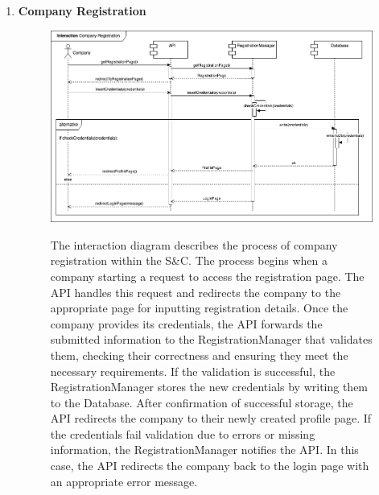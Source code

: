 \begin{enumerate}
    \newpage
    \item \textbf{Company Registration}
    \begin{figure}[h!]
            \centering  \includegraphics[width=1\textwidth]{DD/Images/Interactions/INT08_CompanyRegistration.drawio.png}
            \label{fig:ComponentViewDiagram}
            \caption*{The interaction diagram describes the process of company registration within the S\&C. The process begins when a company starting a request to access the registration page. The API handles this request and redirects the company to the appropriate page for inputting registration details. Once the company provides its credentials, the API forwards the submitted information to the RegistrationManager that validates them, checking their correctness and ensuring they meet the necessary requirements. If the validation is successful, the RegistrationManager stores the new credentials by writing them to the Database. After confirmation of successful storage, the API redirects the company to their newly created profile page. If the credentials fail validation due to errors or missing information, the RegistrationManager notifies the API. In this case, the API redirects the company back to the login page with an appropriate error message.}
    \end{figure}


\end{enumerate}
